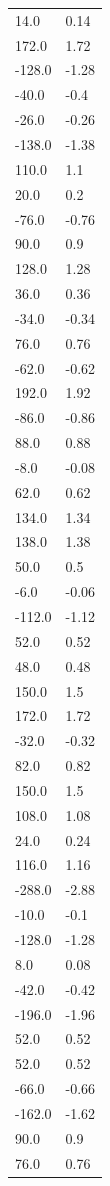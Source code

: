 \begin{longtable}{ll}
14.0 & 0.14 \\
172.0 & 1.72 \\
-128.0 & -1.28 \\
-40.0 & -0.4 \\
-26.0 & -0.26 \\
-138.0 & -1.38 \\
110.0 & 1.1 \\
20.0 & 0.2 \\
-76.0 & -0.76 \\
90.0 & 0.9 \\
128.0 & 1.28 \\
36.0 & 0.36 \\
-34.0 & -0.34 \\
76.0 & 0.76 \\
-62.0 & -0.62 \\
192.0 & 1.92 \\
-86.0 & -0.86 \\
88.0 & 0.88 \\
-8.0 & -0.08 \\
62.0 & 0.62 \\
134.0 & 1.34 \\
138.0 & 1.38 \\
50.0 & 0.5 \\
-6.0 & -0.06 \\
-112.0 & -1.12 \\
52.0 & 0.52 \\
48.0 & 0.48 \\
150.0 & 1.5 \\
172.0 & 1.72 \\
-32.0 & -0.32 \\
82.0 & 0.82 \\
150.0 & 1.5 \\
108.0 & 1.08 \\
24.0 & 0.24 \\
116.0 & 1.16 \\
-288.0 & -2.88 \\
-10.0 & -0.1 \\
-128.0 & -1.28 \\
8.0 & 0.08 \\
-42.0 & -0.42 \\
-196.0 & -1.96 \\
52.0 & 0.52 \\
52.0 & 0.52 \\
-66.0 & -0.66 \\
-162.0 & -1.62 \\
90.0 & 0.9 \\
76.0 & 0.76 \\

\end{longtable}
